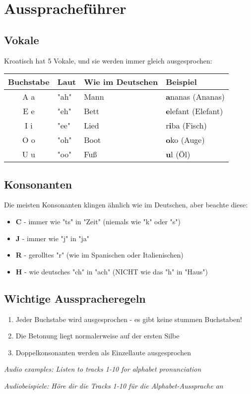 \section{Ausspracheführer}

\begin{grammar}
\subsection*{Vokale}

Kroatisch hat 5 Vokale, und sie werden immer gleich ausgesprochen:

\begin{center}
\begin{tabular}{clll}
\toprule
Buchstabe & Laut & Wie im Deutschen & Beispiel \\
\midrule
A a & "ah" & Mann & \textbf{a}nanas (Ananas) \\
E e & "eh" & Bett & \textbf{e}lefant (Elefant) \\
I i & "ee" & Lied & r\textbf{i}ba (Fisch) \\
O o & "oh" & Boot & \textbf{o}ko (Auge) \\
U u & "oo" & Fuß & \textbf{u}l (Öl) \\
\bottomrule
\end{tabular}
\end{center}

\subsection*{Konsonanten}

Die meisten Konsonanten klingen ähnlich wie im Deutschen, aber beachte diese:

\begin{itemize}
    \item \textbf{C} - immer wie "ts" in "Zeit" (niemals wie "k" oder "s")
    \item \textbf{J} - immer wie "j" in "ja"
    \item \textbf{R} - gerolltes "r" (wie im Spanischen oder Italienischen)
    \item \textbf{H} - wie deutsches "ch" in "ach" (NICHT wie das "h" in "Haus")
\end{itemize}

\subsection*{Wichtige Ausspracheregeln}

\begin{enumerate}
    \item Jeder Buchstabe wird ausgesprochen - es gibt keine stummen Buchstaben!
    \item Die Betonung liegt normalerweise auf der ersten Silbe
    \item Doppelkonsonanten werden als Einzellaute ausgesprochen
\end{enumerate}

\textit{Audio examples: Listen to tracks 1-10 for alphabet pronunciation}

\textit{Audiobeispiele: Höre dir die Tracks 1-10 für die Alphabet-Aussprache an}
\end{grammar}

